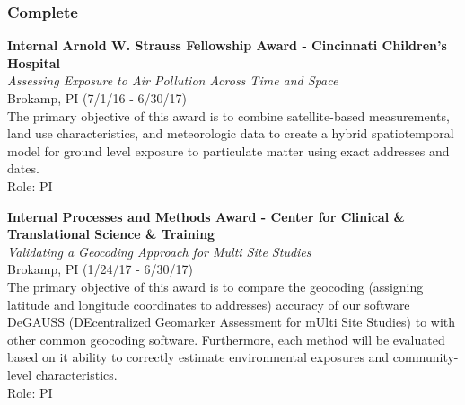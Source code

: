 \hypertarget{complete}{%
\subsubsection{Complete}\label{complete}}

\textbf{Internal Arnold W. Strauss Fellowship Award - Cincinnati
Children's Hospital}\\
\emph{Assessing Exposure to Air Pollution Across Time and Space}\\
Brokamp, PI (7/1/16 - 6/30/17)\\
The primary objective of this award is to combine satellite-based
measurements, land use characteristics, and meteorologic data to create
a hybrid spatiotemporal model for ground level exposure to particulate
matter using exact addresses and dates.\\
Role: PI

\textbf{Internal Processes and Methods Award - Center for Clinical \&
Translational Science \& Training}\\
\emph{Validating a Geocoding Approach for Multi Site Studies}\\
Brokamp, PI (1/24/17 - 6/30/17)\\
The primary objective of this award is to compare the geocoding
(assigning latitude and longitude coordinates to addresses) accuracy of
our software DeGAUSS (DEcentralized Geomarker Assessment for mUlti Site
Studies) to with other common geocoding software. Furthermore, each
method will be evaluated based on it ability to correctly estimate
environmental exposures and community-level characteristics.\\
Role: PI
